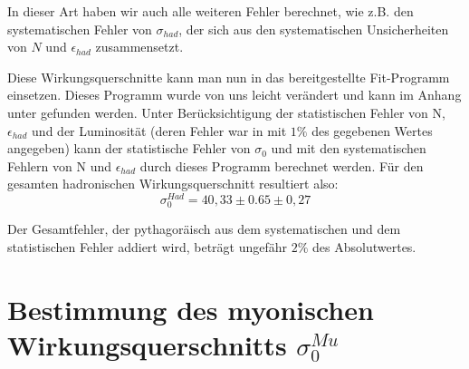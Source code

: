 In dieser Art haben wir auch alle weiteren Fehler berechnet, wie z.B. den systematischen Fehler von $\sigma_{had}$, der sich aus den systematischen Unsicherheiten von $N$ und $\epsilon_{had}$ zusammensetzt.

Diese Wirkungsquerschnitte kann man nun in das bereitgestellte Fit-Programm einsetzen. Dieses Programm wurde von uns leicht verändert und kann im Anhang unter  gefunden werden. Unter Berücksichtigung der statistischen Fehler von N, $\epsilon_{had}$ und der Luminosität (deren Fehler war in \cite[S.9]{script} mit $1\%$ des gegebenen Wertes angegeben) kann der statistische Fehler von $\sigma_0$ und mit den systematischen Fehlern von N und $\epsilon_{had}$ durch dieses Programm berechnet werden. Für den gesamten hadronischen Wirkungsquerschnitt resultiert also:
\begin{equation}
\sigma_0^{Had} = 40,33 \pm 0.65 \pm 0,27
\end{equation}

Der Gesamtfehler, der pythagoräisch aus dem systematischen und dem statistischen Fehler addiert wird, beträgt ungefähr $2\%$ des Absolutwertes.

\section{Bestimmung des myonischen Wirkungsquerschnitts $\sigma_0^{Mu}$}
